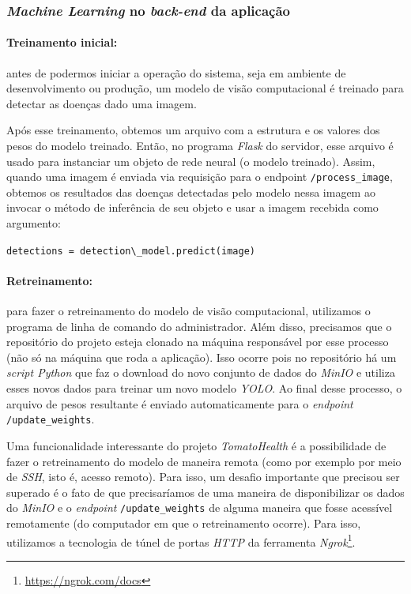 \subsubsection{\emph{Machine Learning} no \emph{back-end} da aplicação}
\paragraph{Treinamento inicial:} antes de podermos iniciar a operação do sistema, seja em ambiente de desenvolvimento ou produção, um modelo de visão computacional é treinado para detectar as doenças dado uma imagem.

Após esse treinamento, obtemos um arquivo com a estrutura e os valores dos pesos do modelo treinado. Então, no programa \emph{Flask} do servidor, esse arquivo é usado para instanciar um objeto de rede neural (o modelo treinado). Assim, quando uma imagem é enviada via requisição para o endpoint \texttt{/process\_image}, obtemos os resultados das doenças detectadas pelo modelo nessa imagem ao invocar o método de inferência de seu objeto e usar a imagem recebida como argumento:
\begin{center}
\lstinline|detections = detection\_model.predict(image)|
\end{center}

\paragraph{Retreinamento:} para fazer o retreinamento do modelo de visão computacional, utilizamos o programa de linha de comando do administrador. Além disso, precisamos que o repositório do projeto esteja clonado na máquina responsável por esse processo (não só na máquina que roda a aplicação). Isso ocorre pois no repositório há um \emph{script Python} que faz o download do novo conjunto de dados do \emph{MinIO} e utiliza esses novos dados para treinar um novo modelo \emph{YOLO}. Ao final desse processo, o arquivo de pesos resultante é enviado automaticamente para o \emph{endpoint} \texttt{/update\_weights}. 

Uma funcionalidade interessante do projeto \emph{TomatoHealth} é a possibilidade de fazer o retreinamento do modelo de maneira remota (como por exemplo por meio de \emph{SSH}, isto é, acesso remoto). Para isso, um desafio importante que precisou ser superado é o fato de que precisaríamos de uma maneira de disponibilizar os dados do \emph{MinIO} e o \emph{endpoint} \texttt{/update\_weights} de alguma maneira que fosse acessível remotamente (do computador em que o retreinamento ocorre). Para isso, utilizamos a tecnologia de túnel de portas \emph{HTTP} da ferramenta \emph{Ngrok}\footnote{\url{https://ngrok.com/docs}}.


